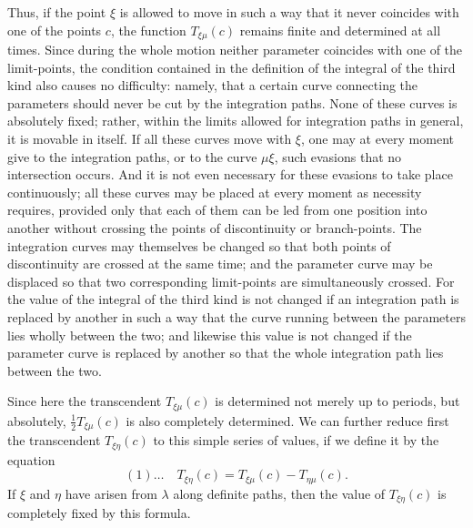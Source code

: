 \documentclass[10pt]{article}
\begin{document}
Thus, if the point \(\xi\) is allowed to move in such a way that it never coincides with one of the points \(c\), the function \(T_{\xi\mu}(c)\) remains finite and determined at all times. Since during the whole motion neither parameter coincides with one of the limit-points, the condition contained in the definition of the integral of the third kind also causes no difficulty: namely, that a certain curve connecting the parameters should never be cut by the integration paths. None of these curves is absolutely fixed; rather, within the limits allowed for integration paths in general, it is movable in itself. If all these curves move with \(\xi\), one may at every moment give to the integration paths, or to the curve \(\mu\xi\), such evasions that no intersection occurs. And it is not even necessary for these evasions to take place continuously; all these curves may be placed at every moment as necessity requires, provided only that each of them can be led from one position into another without crossing the points of discontinuity or branch-points. The integration curves may themselves be changed so that both points of discontinuity are crossed at the same time; and the parameter curve may be displaced so that two corresponding limit-points are simultaneously crossed. For the value of the integral of the third kind is not changed if an integration path is replaced by another in such a way that the curve running between the parameters lies wholly between the two; and likewise this value is not changed if the parameter curve is replaced by another so that the whole integration path lies between the two.

Since here the transcendent \(T_{\xi\mu}(c)\) is determined not merely up to periods, but absolutely, \(\frac12T_{\xi\mu}(c)\) is also completely determined. We can further reduce first the transcendent \(T_{\xi\eta}(c)\) to this simple series of values, if we define it by the equation
\[
(1)\ldots\quad T_{\xi\eta}(c)=T_{\xi\mu}(c)-T_{\eta\mu}(c).
\]
If \(\xi\) and \(\eta\) have arisen from \(\lambda\) along definite paths, then the value of \(T_{\xi\eta}(c)\) is completely fixed by this formula.
\end{document}
